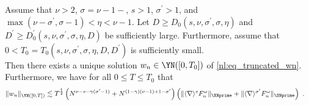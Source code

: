 \documentclass[11pt]{article}
\begin{document}
\begin{prop}\label{nl:prop_wn}
Assume that \( \nu> 2 \), \( \sigma=\nu-1- \), \( s> 1 \), \( \sigma^\prime > 1 \), and \( \max( \nu-\sigma^\prime, \sigma-1 ) < \eta < \nu - 1 \). Let \( D\geq D_0(s,\nu,\sigma^\prime,\sigma,\eta) \) and \( D^\prime\geq D_0^\prime(s,\nu,\sigma^\prime,\sigma,\eta,D) \) be sufficiently large. Furthermore, assume that \( 0<T_0 = T_0(s,\nu,\sigma^\prime,\sigma,\eta,D,D^\prime) \) is sufficiently small. \\
Then there exists a unique solution \( w_n \in \YN([0,T_0]) \) of  \eqref{nl:eq_truncated_wn}. Furthermore, we have for all \( 0 \leq T \leq T_0 \) that
\begin{equation}\label{nl:eq_a_priori}
\begin{aligned}
\| w_n \|_{\YN([0,T])}
&\lesssim T^{\frac{1}{2}} \left( N^{\nu-s-\gamma(\sigma^\prime-1)}+ N^{(1-\gamma)(\nu-1)+1-\sigma^\prime} \right) \left( \| \langle \nabla \rangle^s F_n^\omega \|_{\XNprime}+ \| \langle \nabla \rangle^{\sigma^\prime} F_n^\omega \|_{\SNprime}\right)~.
\end{aligned}
\end{equation}
\end{prop}
\end{document}
